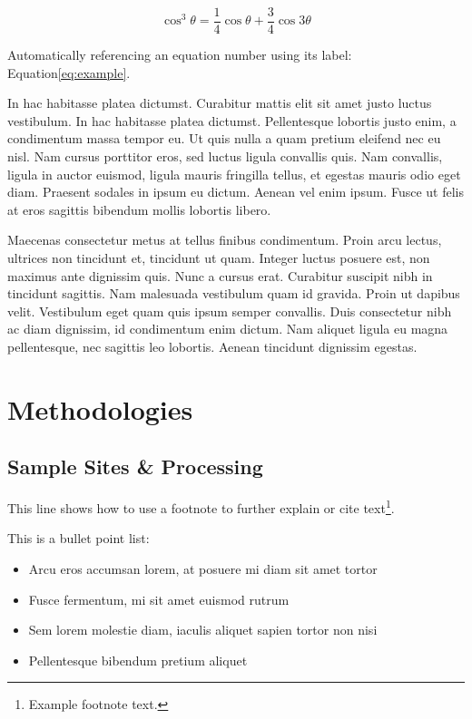 \documentclass[
	a4paper, %
	10pt, %
	unnumberedsections, %
	twoside, %
]{LTJournalArticle}
\begin{document}
\begin{equation}
	\cos^3 \theta =\frac{1}{4}\cos\theta+\frac{3}{4}\cos 3\theta
	\label{eq:example}
\end{equation}

Automatically referencing an equation number using its label: Equation\ref{eq:example}.

In hac habitasse platea dictumst. Curabitur mattis elit sit amet justo luctus vestibulum. In hac habitasse platea dictumst. Pellentesque lobortis justo enim, a condimentum massa tempor eu. Ut quis nulla a quam pretium eleifend nec eu nisl. Nam cursus porttitor eros, sed luctus ligula convallis quis. Nam convallis, ligula in auctor euismod, ligula mauris fringilla tellus, et egestas mauris odio eget diam. Praesent sodales in ipsum eu dictum. Aenean vel enim ipsum. Fusce ut felis at eros sagittis bibendum mollis lobortis libero.

Maecenas consectetur metus at tellus finibus condimentum. Proin arcu lectus, ultrices non tincidunt et, tincidunt ut quam. Integer luctus posuere est, non maximus ante dignissim quis. Nunc a cursus erat. Curabitur suscipit nibh in tincidunt sagittis. Nam malesuada vestibulum quam id gravida. Proin ut dapibus velit. Vestibulum eget quam quis ipsum semper convallis. Duis consectetur nibh ac diam dignissim, id condimentum enim dictum. Nam aliquet ligula eu magna pellentesque, nec sagittis leo lobortis. Aenean tincidunt dignissim egestas.


\section{Methodologies}

\subsection{Sample Sites \& Processing}

This line shows how to use a footnote to further explain or cite text\footnote{Example footnote text.}.

This is a bullet point list:

\begin{itemize}
	\item Arcu eros accumsan lorem, at posuere mi diam sit amet tortor
	\item Fusce fermentum, mi sit amet euismod rutrum
	\item Sem lorem molestie diam, iaculis aliquet sapien tortor non nisi
	\item Pellentesque bibendum pretium aliquet
\end{itemize}
\end{document}
